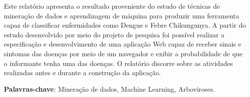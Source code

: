 
\setlength{\absparsep}{18pt} %
\begin{resumo}
Este relatório apresenta o resultado proveniente do estudo de técnicas de mineração de dados e aprendizagem de máquina para produzir uma ferramenta capaz de classificar enfermidades como Dengue e Febre Chikungunya. A partir do estudo desenvolvido por meio do projeto de pesquisa foi possível realizar a especificação e desenvolvimento de uma aplicação Web capaz de receber sinais e sintomas das doenças por meio de um navegador e exibir a probabilidade de que o informante tenha uma das doenças. O relatório discorre sobre as atividades realizadas antes e durante a construção da aplicação.

 \textbf{Palavras-chave}: Mineração de dados, Machine Learning, Arboviroses.
\end{resumo}